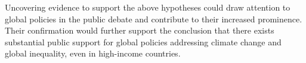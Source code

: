 

Uncovering evidence to support the above hypotheses could draw attention to global policies in the public debate and contribute to their increased prominence. Their confirmation would further support the conclusion that there exists substantial public support for global policies addressing climate change and global inequality, even in high-income countries.

